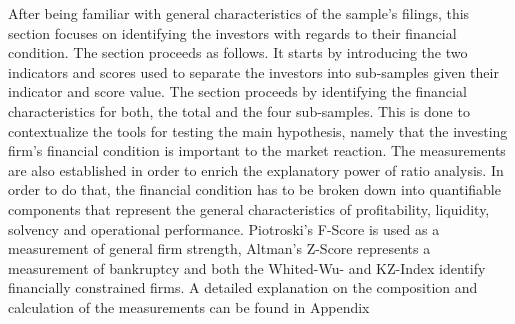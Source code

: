 \documentclass[12pt]{article}
\begin{document}
After being familiar with general characteristics of the sample's filings, this section focuses on identifying the investors with regards to their financial condition. The section proceeds as follows. It starts by introducing the two indicators and scores used to separate the investors into sub-samples given their indicator and score value. The section proceeds by identifying the financial characteristics for both, the total and the four sub-samples. This is done to contextualize the tools for testing the main hypothesis, namely that the investing firm's financial condition is important to the market reaction. The measurements are also established in order to enrich the explanatory power of ratio analysis.
In order to do that, the financial condition has to be broken down into quantifiable components that represent the general characteristics of profitability, liquidity, solvency and operational performance. Piotroski's F-Score is used as a measurement of general firm strength, Altman's Z-Score represents a measurement of bankruptcy and both the Whited-Wu- and KZ-Index identify financially constrained firms. A detailed explanation on the composition and calculation of the measurements can be found in Appendix 

\end{document}
